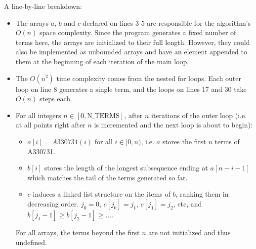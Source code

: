 \documentclass{article}
\begin{document}
\newpage

A line-by-line breakdown:

\begin{itemize}
\item
  The arrays $a$, $b$ and $c$ declared on lines 3-5
  are responsible for the algorithm's $O(n)$ space complexity.
  Since the program generates a fixed number of terms here,
  the arrays are initialized to their full length.
  However, they could also be implemented as unbounded arrays
  and have an element appended to them at the beginning
  of each iteration of the main loop.
\item
  The $O(n^2)$ time complexity
  comes from the nested for loops. 
  Each outer loop on line 8 generates a single term,
  and the loops on lines 17 and 30 take $O(n)$ steps each.
\item
  For all integers $n \in [0, \text{N\_TERMS}]$,
  after $n$ iterations of the outer loop
  (i.e. at all points right after $n$ is incremented
  and the next loop is about to begin):
  \begin{itemize}
  \item
    $a[i] = A330731(i)$ for all $i \in [0, n)$,
    i.e. $a$ stores the first $n$ terms of A330731.
  \item
    $b[i]$ stores the length of the longest subsequence
    ending at $a[n-i-1]$
    which matches the tail of the terms generated so far.
  \item
    $c$ induces a linked list structure on the items of $b$,
    ranking them in decreasing order.
    $j_0 = 0$, $c[j_0]=j_1$, $c[j_1]=j_2$, etc,
    and $b[j_1-1] \geq b[j_2-1] \geq \ldots$.
  \end{itemize}
  For all arrays,
  the terms beyond the first $n$ are not initialized and thus undefined.
\end{itemize}
\end{document}
